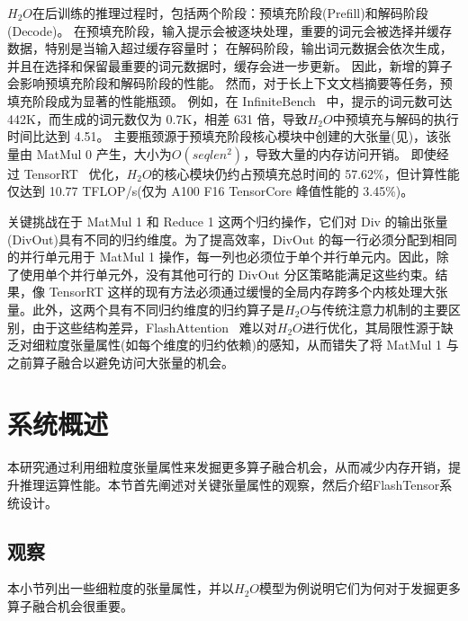 \(H_{2}O\)在后训练的推理过程时，包括两个阶段：预填充阶段(Prefill)和解码阶段(Decode)。
在预填充阶段，输入提示会被逐块处理，重要的词元会被选择并缓存数据，特别是当输入超过缓存容量时；
在解码阶段，输出词元数据会依次生成，并且在选择和保留最重要的词元数据时，缓存会进一步更新。
因此，新增的算子会影响预填充阶段和解码阶段的性能。
然而，对于长上下文文档摘要等任务，预填充阶段成为显著的性能瓶颈。
例如，在 InfiniteBench~\cite{zhang2024infinitebench} 中，提示的词元数可达 442K，而生成的词元数仅为 0.7K，相差 631 倍，导致\(H_{2}O\)中预填充与解码的执行时间比达到 4.51。
主要瓶颈源于预填充阶段核心模块中创建的大张量(见)，该张量由 MatMul 0 产生，大小为\(O(seqlen ^{2})\)，导致大量的内存访问开销。
即使经过 TensorRT~\cite{tensorrt} 优化，\(H_{2}O\)的核心模块仍约占预填充总时间的 57.62\%，但计算性能仅达到 10.77 TFLOP/s(仅为 A100 F16 TensorCore 峰值性能的 3.45\%)。

关键挑战在于 MatMul 1 和 Reduce 1 这两个归约操作，它们对 Div 的输出张量(DivOut)具有不同的归约维度。为了提高效率，DivOut 的每一行必须分配到相同的并行单元用于 MatMul 1 操作，每一列也必须位于单个并行单元内。因此，除了使用单个并行单元外，没有其他可行的 DivOut 分区策略能满足这些约束。结果，像 TensorRT 这样的现有方法必须通过缓慢的全局内存跨多个内核处理大张量。此外，这两个具有不同归约维度的归约算子是\(H_{2}O\)与传统注意力机制的主要区别，由于这些结构差异，FlashAttention~\cite{dao2023flashattention} 难以对\(H_{2}O\)进行优化，其局限性源于缺乏对细粒度张量属性(如每个维度的归约依赖)的感知，从而错失了将 MatMul 1 与之前算子融合以避免访问大张量的机会。

\section{系统概述}

本研究通过利用细粒度张量属性来发掘更多算子融合机会，从而减少内存开销，提升推理运算性能。本节首先阐述对关键张量属性的观察，然后介绍FlashTensor系统设计。

\subsection{观察}

本小节列出一些细粒度的张量属性，并以\(H_{2}O\)模型为例说明它们为何对于发掘更多算子融合机会很重要。

